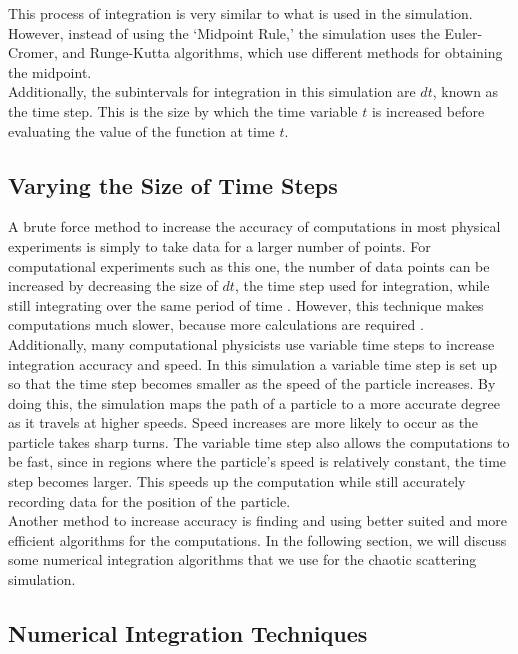 \documentclass[12pt]{article} %
\begin{document}
This process of integration is very similar to what is used in the simulation. However, instead of using the `Midpoint Rule,' the simulation uses the Euler-Cromer, and Runge-Kutta algorithms, which use different methods for obtaining the midpoint. \\

Additionally, the subintervals for integration in this simulation are $dt$, known as the time step. This is the size by which the time variable $t$ is increased before evaluating the value of the function at time $t$.


\subsection{Varying the Size of Time Steps}

 

A brute force method to increase the accuracy of computations in most physical experiments is simply to take data for a larger number of points. For computational experiments such as this one, the number of data points can be increased by decreasing the size of $dt$, the time step used for integration, while still integrating over the same period of time \cite{computationalText}. However, this technique makes computations much slower, because more calculations are required \cite{computationalText}. \\

Additionally, many computational physicists use variable time steps to increase integration accuracy and speed. In this simulation a variable time step is set up so that the time step becomes smaller as the speed of the particle increases. By doing this, the simulation maps the path of a particle to a more accurate degree as it travels at higher speeds. Speed increases are more likely to occur as the particle takes sharp turns. The variable time step also allows the computations to be fast, since in regions where the particle's speed is relatively constant, the time step becomes larger. This speeds up the computation while still accurately recording data for the position of the particle. \\

Another method to increase accuracy is finding and using better suited and more efficient algorithms for the computations. In the following section, we will discuss some numerical integration algorithms that we use for the chaotic scattering simulation. 


\subsection{Numerical Integration Techniques}
\end{document}
